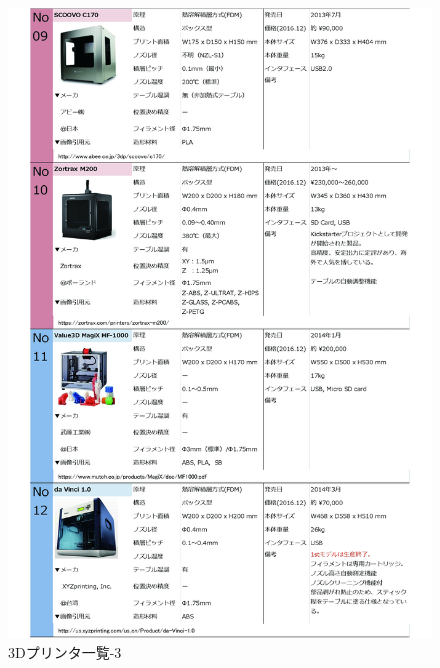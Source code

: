 \begin{figure}[htbp]
\centering
\includegraphics[width=380pt]{fig/fig26_cmyk.jpg}
\caption{3Dプリンタ一覧-3}
\label{fig26}
\end{figure}


